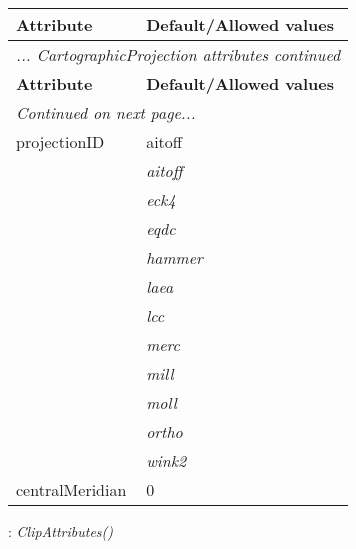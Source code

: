 \documentclass[10pt,a4paper]{report}
\begin{document}
\begin{longtable}{ll}
{\bf Attribute} & {\bf Default/Allowed values} \\
\hline \hline
\endfirsthead
\multicolumn{2}{l}{{\it ... CartographicProjection attributes continued}} \\
{\bf Attribute} & {\bf Default/Allowed values} \\
\hline \hline
\endhead
\hline
\multicolumn{2}{l}{{\it Continued on next page...}} \\
\endfoot
\hline
\endlastfoot

projectionID  &  aitoff   \\
 & {\it  aitoff} \\
 & {\it  eck4} \\
 & {\it  eqdc} \\
 & {\it  hammer} \\
 & {\it  laea} \\
 & {\it  lcc} \\
 & {\it  merc} \\
 & {\it  mill} \\
 & {\it  moll} \\
 & {\it  ortho} \\
 & {\it  wink2} \\
centralMeridian  &  0 \\
\end{longtable}

\newpage

{}
: {\it ClipAttributes() }\\[-3mm]
\end{document}

